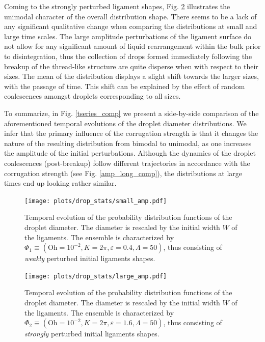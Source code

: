 Coming to the strongly perturbed ligament shapes, Fig. \ref{tseries_large} illustrates 
the unimodal character of the overall distribution shape.
There seems to be a lack of any significant qualitative change 
when comparing the distributions at small and large time scales. 
The large amplitude perturbations of the ligament surface do not 
allow for any significant amount of liquid rearrangement within the bulk prior 
to disintegration, thus the collection of drops formed immediately following the breakup
of the thread-like structure are quite disperse when with respect to their sizes.
The mean of the distribution displays a slight shift towards the larger sizes, with the passage of time. 
This shift can be explained by the effect of random coalescences amongst droplets corresponding to all sizes.

To summarize, in Fig. \ref{tseries_comp} we present a side-by-side comparison of 
the aforementioned temporal evolutions of the droplet diameter distributions.  
We infer that the primary influence of the corrugation strength 
is that it changes the nature of the resulting distribution from bimodal to unimodal,
as one increases the amplitude of the initial perturbations. 
Although the dynamics of the droplet coalescences (post-breakup) follow different trajectories
in accordance with the corrugation strength (see Fig. \ref{amp_long_comp}), 
the distributions at large times end up looking rather similar.


\begin{figure}
\centering
\texttt{[image: plots/drop\_stats/small\_amp.pdf]}
\caption{Temporal evolution of the probability distribution functions of the droplet diameter.
	The diameter is rescaled by the initial width $W$ of the ligaments.
	The ensemble is characterized by $\Phi_1 \equiv \left( \textrm{Oh} = 10^{-2}, K = 2\pi 
, \varepsilon = 0.4 , \Lambda = 50 \right)$, thus consisting of \textit{weakly} perturbed 
initial ligaments shapes. 
	}
\label{tseries_small}
\end{figure}

\begin{figure}
\centering
\texttt{[image: plots/drop\_stats/large\_amp.pdf]}
\caption{Temporal evolution of the probability distribution functions of the droplet diameter.
	The diameter is rescaled by the initial width $W$ of the ligaments.
	The ensemble is characterized by $\Phi_2 \equiv \left( \textrm{Oh} = 10^{-2}, K = 2\pi 
, \varepsilon = 1.6 , \Lambda = 50 \right)$, thus consisting of \textit{strongly} perturbed 
initial ligaments shapes. 
	}
\label{tseries_large}
\end{figure}

